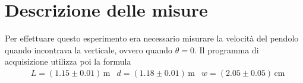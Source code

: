 \documentclass{article}
\begin{document}
	\section{Descrizione delle misure}
	Per effettuare questo esperimento era necessario misurare la velocità del pendolo quando incontrava la verticale, ovvero quando $\theta = 0$. Il programma di acquisizione utilizza poi la formula
\begin{align*}
	&L = (1.15 \pm 0.01) \, \si{\meter}
	&d = (1.18 \pm 0.01) \, \si{\meter}
	&w = (2.05 \pm 0.05) \, \si{\centi\meter}
\end{align*}
\end{document}
